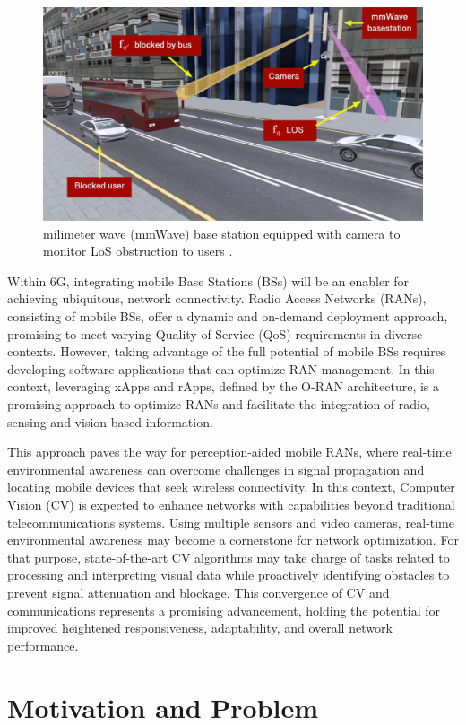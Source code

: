 \begin{figure}[H]
    \centering
    \includegraphics[width=0.7\linewidth]{figures/urban_scenario}
    \caption[mmWave base station equipped with camera to monitor LoS obstruction to users]{milimeter wave (mmWave) base station equipped with camera to monitor LoS obstruction to users \cite{Block_predict}.}
    \label{fig:urban_scenario}
\end{figure}

Within 6G, integrating mobile Base Stations (BSs) will be an enabler for achieving ubiquitous, network connectivity.
Radio Access Networks (RANs), consisting of mobile BSs, offer a dynamic and on-demand deployment approach, promising to meet varying Quality of Service (QoS) requirements in diverse contexts.
However, taking advantage of the full potential of mobile BSs requires developing software applications that can optimize RAN management.
In this context, leveraging xApps and rApps, defined by the O-RAN architecture, is a promising approach to optimize RANs and facilitate the integration of radio, sensing and vision-based information.

This approach paves the way for perception-aided mobile RANs, where real-time environmental awareness can overcome challenges in signal propagation and locating mobile devices that seek wireless connectivity.
In this context, Computer Vision (CV) is expected to enhance networks with capabilities beyond traditional telecommunications systems.
Using multiple sensors and video cameras, real-time environmental awareness may become a cornerstone for network optimization.
For that purpose, state-of-the-art CV algorithms may take charge of tasks related to processing and interpreting visual data while proactively identifying obstacles to prevent signal attenuation and blockage.
This convergence of CV and communications represents a promising advancement, holding the potential for improved heightened responsiveness, adaptability, and overall network performance.

\section{Motivation and Problem}\label{sec:motivation-and-problem}

